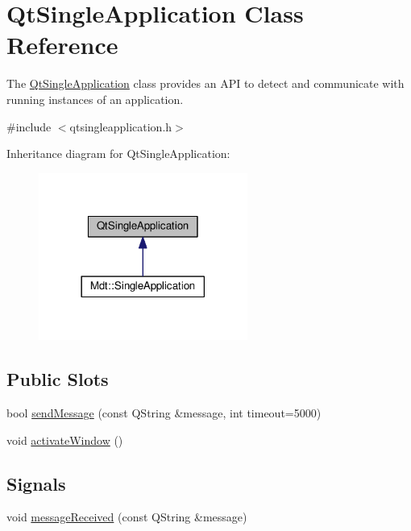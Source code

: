 \hypertarget{class_qt_single_application}{}\section{Qt\+Single\+Application Class Reference}
\label{class_qt_single_application}


The \hyperlink{class_qt_single_application}{Qt\+Single\+Application} class provides an A\+PI to detect and communicate with running instances of an application.  




{\ttfamily \#include $<$qtsingleapplication.\+h$>$}



Inheritance diagram for Qt\+Single\+Application\+:
\nopagebreak
\begin{figure}[H]
\begin{center}
\leavevmode
\includegraphics[width=194pt]{class_qt_single_application__inherit__graph}
\end{center}
\end{figure}
\subsection*{Public Slots}
\begin{DoxyCompactItemize}
\item 
bool \hyperlink{class_qt_single_application_a0e2f3900f0290913c738ec6b4b959922}{send\+Message} (const Q\+String \&message, int timeout=5000)
\item 
void \hyperlink{class_qt_single_application_a0881b32c76132b499f3180064006abc1}{activate\+Window} ()
\end{DoxyCompactItemize}
\subsection*{Signals}
\begin{DoxyCompactItemize}
\item 
void \hyperlink{class_qt_single_application_a69340cef3d26d026e11424930e5a5866}{message\+Received} (const Q\+String \&message)
\end{DoxyCompactItemize}
